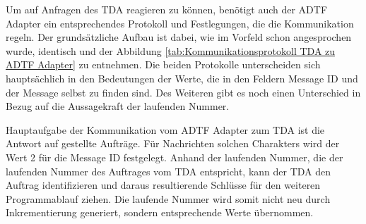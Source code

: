 \documentclass[12pt,a4paper]{report}
\begin{document}
Um auf Anfragen des TDA reagieren zu können, benötigt auch der ADTF Adapter ein entsprechendes Protokoll und Festlegungen, die die Kommunikation regeln. Der grundsätzliche Aufbau ist dabei, wie im Vorfeld schon angesprochen wurde, identisch und der Abbildung \ref{tab:Kommunikationsprotokoll TDA zu ADTF Adapter} zu entnehmen. Die beiden Protokolle unterscheiden sich hauptsächlich in den Bedeutungen der Werte, die in den Feldern Message ID und der Message selbst zu finden sind. Des Weiteren gibt es noch einen Unterschied in Bezug auf die Aussagekraft der laufenden Nummer.

Hauptaufgabe der Kommunikation vom ADTF Adapter zum TDA ist die Antwort auf gestellte Aufträge. Für Nachrichten solchen Charakters wird der Wert 2 für die Message ID festgelegt. Anhand der laufenden Nummer, die der laufenden Nummer des Auftrages vom TDA entspricht, kann der TDA den Auftrag identifizieren und daraus resultierende Schlüsse für den weiteren Programmablauf ziehen. Die laufende Nummer wird somit nicht neu durch Inkrementierung generiert, sondern entsprechende Werte übernommen. 
\end{document}

